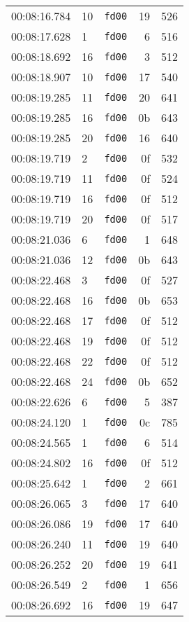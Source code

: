 \documentclass{article}
\begin{document}
\begin{longtable}{lllrr}
00:08:16.784 & 10 & \texttt{fd00} & 19 & 526 \\
00:08:17.628 & 1 & \texttt{fd00} & 6 & 516 \\
00:08:18.692 & 16 & \texttt{fd00} & 3 & 512 \\
00:08:18.907 & 10 & \texttt{fd00} & 17 & 540 \\
00:08:19.285 & 11 & \texttt{fd00} & 20 & 641 \\
00:08:19.285 & 16 & \texttt{fd00} & 0b & 643 \\
00:08:19.285 & 20 & \texttt{fd00} & 16 & 640 \\
00:08:19.719 & 2 & \texttt{fd00} & 0f & 532 \\
00:08:19.719 & 11 & \texttt{fd00} & 0f & 524 \\
00:08:19.719 & 16 & \texttt{fd00} & 0f & 512 \\
00:08:19.719 & 20 & \texttt{fd00} & 0f & 517 \\
00:08:21.036 & 6 & \texttt{fd00} & 1 & 648 \\
00:08:21.036 & 12 & \texttt{fd00} & 0b & 643 \\
00:08:22.468 & 3 & \texttt{fd00} & 0f & 527 \\
00:08:22.468 & 16 & \texttt{fd00} & 0b & 653 \\
00:08:22.468 & 17 & \texttt{fd00} & 0f & 512 \\
00:08:22.468 & 19 & \texttt{fd00} & 0f & 512 \\
00:08:22.468 & 22 & \texttt{fd00} & 0f & 512 \\
00:08:22.468 & 24 & \texttt{fd00} & 0b & 652 \\
00:08:22.626 & 6 & \texttt{fd00} & 5 & 387 \\
00:08:24.120 & 1 & \texttt{fd00} & 0c & 785 \\
00:08:24.565 & 1 & \texttt{fd00} & 6 & 514 \\
00:08:24.802 & 16 & \texttt{fd00} & 0f & 512 \\
00:08:25.642 & 1 & \texttt{fd00} & 2 & 661 \\
00:08:26.065 & 3 & \texttt{fd00} & 17 & 640 \\
00:08:26.086 & 19 & \texttt{fd00} & 17 & 640 \\
00:08:26.240 & 11 & \texttt{fd00} & 19 & 640 \\
00:08:26.252 & 20 & \texttt{fd00} & 19 & 641 \\
00:08:26.549 & 2 & \texttt{fd00} & 1 & 656 \\
00:08:26.692 & 16 & \texttt{fd00} & 19 & 647 \\

\end{longtable}
\end{document}

